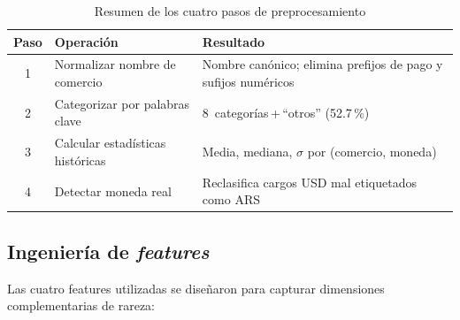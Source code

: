 \documentclass[conference]{IEEEtran}
\begin{document}
\begin{table}[h]
\caption{Resumen de los cuatro pasos de preprocesamiento}
\label{tab:preprocessing}
\centering
\begin{tabular}{clp{3.5cm}}
\toprule
\textbf{Paso} & \textbf{Operaci\'on} & \textbf{Resultado} \\
\midrule
1 & Normalizar nombre de comercio  & Nombre can\'onico; elimina prefijos de pago y sufijos num\'ericos \\
2 & Categorizar por palabras clave & 8~categor\'ias\,+\,``otros'' (52.7\,\%) \\
3 & Calcular estad\'isticas hist\'oricas & Media, mediana, $\sigma$ por (comercio, moneda) \\
4 & Detectar moneda real           & Reclasifica cargos USD mal etiquetados como ARS \\
\bottomrule
\end{tabular}
\end{table}

\subsection{Ingenier\'ia de \emph{features}}
\label{sec:features}

Las cuatro features utilizadas se dise\~naron para capturar dimensiones
complementarias de rareza:
\end{document}
